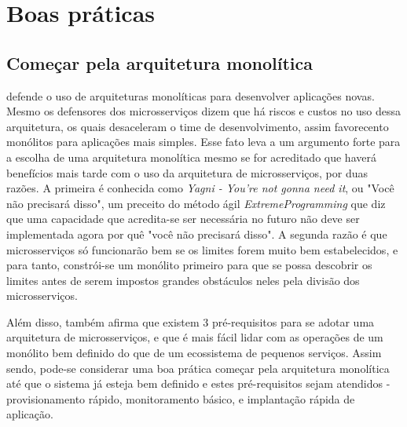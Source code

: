 \chapter{Boas práticas}\label{chapter-boas-praticas}


\section{Começar pela arquitetura monolítica}


 defende o uso de arquiteturas monolíticas para desenvolver aplicações novas. Mesmo os defensores dos microsserviços dizem que há riscos e custos no uso dessa arquitetura, os quais desaceleram o time de desenvolvimento, assim favorecento monólitos para aplicações mais simples. Esse fato leva a um argumento forte para a escolha de uma arquitetura monolítica mesmo se for acreditado que haverá benefícios mais tarde com o uso da arquitetura de microsserviços, por duas razões. A primeira é conhecida como \emph{Yagni - You're not gonna need it}, ou "Você não precisará disso", um preceito do método ágil \emph{ExtremeProgramming} que diz que uma capacidade que acredita-se ser necessária no futuro não deve ser implementada agora por quê "você não precisará disso". A segunda razão é que microsserviços só funcionarão bem se os limites forem muito bem estabelecidos, e para tanto, constrói-se um monólito primeiro para que se possa descobrir os limites antes de serem impostos grandes obstáculos neles pela divisão dos microsserviços. \cite{martin-fowler-monolith-first}

Além disso,  também afirma que existem 3 pré-requisitos para se adotar uma arquitetura de microsserviços, e que é mais fácil lidar com as operações de um monólito bem definido do que de um ecossistema de pequenos serviços. Assim sendo, pode-se considerar uma boa prática começar pela arquitetura monolítica até que o sistema já esteja bem definido e estes pré-requisitos sejam atendidos - provisionamento rápido, monitoramento básico, e implantação rápida de aplicação. \cite{MartinFowlerMicroservicesPrereq}

